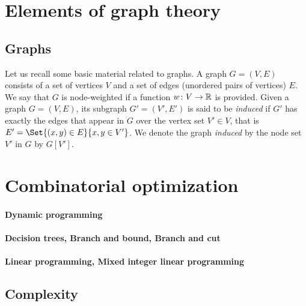 	\section{Elements of graph theory}

		\subsection{Graphs}
			Let us recall some basic material related to graphs.
			A graph $G = (V,E)$ consists of a set of vertices $V$ and a set of edges (unordered pairs of vertices) $E$.
			We say that $G$ is node-weighted if a function $w\colon V \to \mathbb{R}$ is provided.
			Given a graph $G = (V, E)$, its subgraph $G' = (V', E')$ is said to be \emph{induced} if $G'$ has exactly the edges that appear in $G$ over the vertex set $V' \in V$, that is $E' = \Set{(x, y) \in E}{x,y \in V'}$.
			We  denote the graph \emph{induced} by the node set $V'$ in $G$ by $G\left[V'\right]$.


	\section{Combinatorial optimization}
		\paragraph{Dynamic programming}
		\paragraph{Decision trees, Branch and bound, Branch and cut}
		\paragraph{Linear programming, Mixed integer linear programming}

		\subsection{Complexity}

